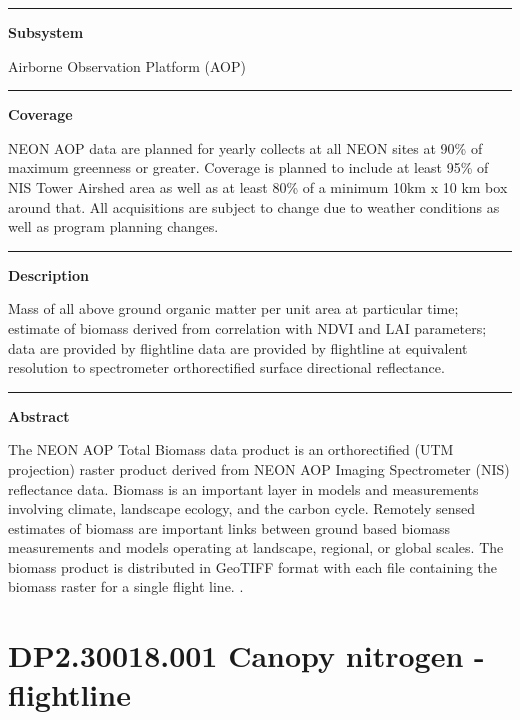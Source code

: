 \documentclass[]{article}
\begin{document}
\begin{center}\rule{0.5\linewidth}{\linethickness}\end{center}

\textbf{Subsystem}

Airborne Observation Platform (AOP)

\begin{center}\rule{0.5\linewidth}{\linethickness}\end{center}

\textbf{Coverage}

NEON AOP data are planned for yearly collects at all NEON sites at 90\%
of maximum greenness or greater. Coverage is planned to include at least
95\% of NIS Tower Airshed area as well as at least 80\% of a minimum
10km x 10 km box around that. All acquisitions are subject to change due
to weather conditions as well as program planning changes.

\begin{center}\rule{0.5\linewidth}{\linethickness}\end{center}

\textbf{Description}

Mass of all above ground organic matter per unit area at particular
time; estimate of biomass derived from correlation with NDVI and LAI
parameters; data are provided by flightline data are provided by
flightline at equivalent resolution to spectrometer orthorectified
surface directional reflectance.

\begin{center}\rule{0.5\linewidth}{\linethickness}\end{center}

\textbf{Abstract}

The NEON AOP Total Biomass data product is an orthorectified (UTM
projection) raster product derived from NEON AOP Imaging Spectrometer
(NIS) reflectance data. Biomass is an important layer in models and
measurements involving climate, landscape ecology, and the carbon cycle.
Remotely sensed estimates of biomass are important links between ground
based biomass measurements and models operating at landscape, regional,
or global scales. The biomass product is distributed in GeoTIFF format
with each file containing the biomass raster for a single flight line.
\newpage
.

\section{DP2.30018.001 Canopy nitrogen -
flightline}\label{dp2.30018.001-canopy-nitrogen---flightline}
\end{document}
